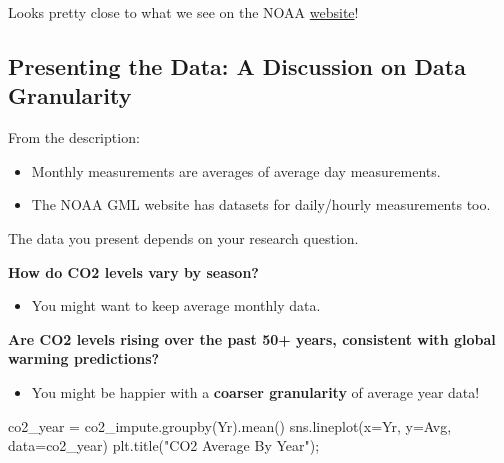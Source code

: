 \documentclass[
  letterpaper,
  DIV=11,
  numbers=noendperiod]{scrreprt}
\newenvironment{Shaded}{\begin{snugshade}}{\end{snugshade}}
\newcommand{\NormalTok}[1]{\textcolor[rgb]{0.00,0.23,0.31}{#1}}
\newcommand{\OperatorTok}[1]{\textcolor[rgb]{0.37,0.37,0.37}{#1}}
\newcommand{\StringTok}[1]{\textcolor[rgb]{0.13,0.47,0.30}{#1}}
\providecommand{\tightlist}{%
  \setlength{\itemsep}{0pt}\setlength{\parskip}{0pt}}\usepackage{longtable,booktabs,array}
\begin{document}
Looks pretty close to what we see on the NOAA
\href{https://gml.noaa.gov/ccgg/trends/}{website}!

\hypertarget{presenting-the-data-a-discussion-on-data-granularity}{%
\subsection{Presenting the Data: A Discussion on Data
Granularity}\label{presenting-the-data-a-discussion-on-data-granularity}}

From the description:

\begin{itemize}
\tightlist
\item
  Monthly measurements are averages of average day measurements.
\item
  The NOAA GML website has datasets for daily/hourly measurements too.
\end{itemize}

The data you present depends on your research question.

\textbf{How do CO2 levels vary by season?}

\begin{itemize}
\tightlist
\item
  You might want to keep average monthly data.
\end{itemize}

\textbf{Are CO2 levels rising over the past 50+ years, consistent with
global warming predictions?}

\begin{itemize}
\tightlist
\item
  You might be happier with a \textbf{coarser granularity} of average
  year data!
\end{itemize}

\begin{Shaded}
\begin{Highlighting}[]
\NormalTok{co2\_year }\OperatorTok{=}\NormalTok{ co2\_impute.groupby(}\StringTok{\textquotesingle{}Yr\textquotesingle{}}\NormalTok{).mean()}
\NormalTok{sns.lineplot(x}\OperatorTok{=}\StringTok{\textquotesingle{}Yr\textquotesingle{}}\NormalTok{, y}\OperatorTok{=}\StringTok{\textquotesingle{}Avg\textquotesingle{}}\NormalTok{, data}\OperatorTok{=}\NormalTok{co2\_year)}
\NormalTok{plt.title(}\StringTok{"CO2 Average By Year"}\NormalTok{)}\OperatorTok{;}
\end{Highlighting}
\end{Shaded}
\end{document}
